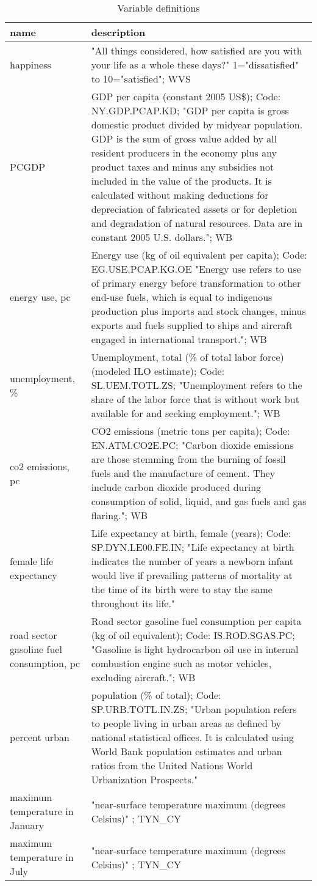 \begin{table}[H]\centering\footnotesize
 \caption{\label{var_des} Variable definitions}
\begin{tabular} {p{1.5in}p{4.5in}}   \hline
name & description   \\ \hline
  happiness & "All things considered, how satisfied are you with your life as a whole these days?" 1="dissatisfied" to 10="satisfied"; WVS \\
  PCGDP & GDP per capita (constant 2005 US\$); Code: NY.GDP.PCAP.KD; "GDP per capita is gross domestic product divided by midyear population. GDP is the sum of gross value added by all resident producers in the economy plus any product taxes and minus any subsidies not included in the value of the products. It is calculated without making deductions for depreciation of fabricated assets or for depletion and degradation of natural resources. Data are in constant 2005 U.S. dollars."; WB \\
  energy use, pc & Energy use (kg of oil equivalent per capita); Code: EG.USE.PCAP.KG.OE "Energy use refers to use of primary energy before transformation to other end-use fuels, which is equal to indigenous production plus imports and stock changes, minus exports and fuels supplied to ships and aircraft engaged in international transport."; WB \\
  unemployment, \% & Unemployment, total (\% of total labor force) (modeled ILO estimate); Code: SL.UEM.TOTL.ZS; "Unemployment refers to the share of the labor force that is without work but available for and seeking employment."; WB \\
  co2 emissions, pc & CO2 emissions (metric tons per capita); Code: EN.ATM.CO2E.PC; "Carbon dioxide emissions are those stemming from the burning of fossil fuels and the manufacture of cement. They include carbon dioxide produced during consumption of solid, liquid, and gas fuels and gas flaring."; WB \\
  female life expectancy & Life expectancy at birth, female (years); Code: SP.DYN.LE00.FE.IN; "Life expectancy at birth indicates the number of years a newborn infant would live if prevailing patterns of mortality at the time of its birth were to stay the same throughout its life." \\
  road sector gasoline fuel consumption, pc & Road sector gasoline fuel consumption per capita (kg of oil equivalent); Code: IS.ROD.SGAS.PC; "Gasoline is light hydrocarbon oil use in internal combustion engine such as motor vehicles, excluding aircraft."; WB \\
  percent urban & population (\% of total); Code: SP.URB.TOTL.IN.ZS; "Urban population refers to people living in urban areas as defined by national statistical offices. It is calculated using World Bank population estimates and urban ratios from the United Nations World Urbanization Prospects." \\
  maximum temperature in January & "near-surface temperature maximum (degrees Celsius)" ; TYN\_CY \\
  maximum temperature in July & "near-surface temperature maximum (degrees Celsius)" ; TYN\_CY \\
\hline\end{tabular}\end{table}